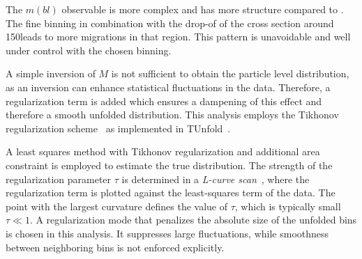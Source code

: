 The $m(bl)$ observable is more complex and has more structure compared to \pt.
The fine binning in combination with the drop-of of the cross section around 150\GeV leads to
more migrations in that region. This pattern is unavoidable and well under
control with the chosen binning.

A simple inversion of $M$ is
not sufficient to obtain the particle level distribution, as an inversion can enhance statistical fluctuations in the data.
Therefore, a regularization term is added which ensures a dampening of this effect
and therefore a smooth unfolded distribution.
This analysis employs the Tikhonov regularization scheme~\cite{Tikhonov1995}
as implemented in TUnfold~\cite{Schmitt:2019um}.


A least squares method with Tikhonov regularization and additional
area constraint is employed to estimate the true distribution. 
The strength of the regularization parameter $\tau$ is determined in a \textit{L-curve scan}~\cite{lCurve}, 
where the regularization term is plotted against the least-squares term of the data. 
The point with the largest curvature defines the value of $\tau$, which is typically small $\tau \ll 1$.
A regularization mode that penalizes the absolute size of the unfolded bins
is chosen in this analysis. It suppresses large fluctuations, while smoothness between neighboring bins is not enforced explicitly.


